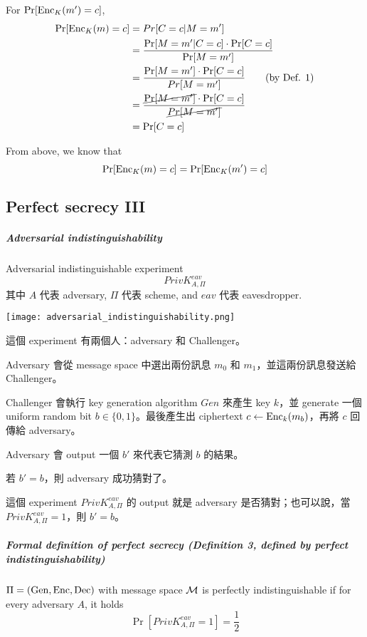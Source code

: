For \(\Pr[\operatorname{Enc}_K(m') = c]\),
\begin{align*}
	\Pr[\operatorname{Enc}_K(m) = c] &= Pr[C = c | M = m']\\
	&= \frac{\Pr[M = m' | C = c] \cdot \Pr[C = c]}{\Pr[M = m']} \\
	&= \frac{\Pr[M = m'] \cdot \Pr[C =c]}{Pr[M = m']} \tag{by Def. 1} \\
	&= \frac{\cancel{\Pr[M = m']} \cdot \Pr[C = c]}{\cancel{Pr[M = m']}} \\
	&= \Pr[C = c]
\end{align*}

From above, we know that
\[
	\Pr[\operatorname{Enc}_K(m) = c] = \Pr[\operatorname{Enc}_K(m') = c]
\]


\subsection{Perfect secrecy III}

\subparagraph{Adversarial indistinguishability}

Adversarial indistinguishable experiment
\[PrivK_{A, \Pi}^{eav}\]
其中 \(A\) 代表 adversary, \(\Pi\) 代表 scheme, and \(eav\) 代表 eavesdropper.

\texttt{[image: adversarial\_indistinguishability.png]}

這個 experiment 有兩個人：adversary 和 Challenger。
\begin{steps}
	\item Adversary 會從 message space 中選出兩份訊息 \(m_0\) 和 \(m_1\)，並這兩份訊息發送給 Challenger。
	\item Challenger 會執行 key generation algorithm \(Gen\) 來產生 key \(k\)，並 generate 一個 uniform random bit \(b \in \{0,1\}\)。最後產生出 ciphertext \(c \leftarrow \operatorname{Enc}_k(m_b)\)，再將 \(c\) 回傳給 adversary。
	\item Adversary 會 output 一個 \(b'\) 來代表它猜測 \(b\) 的結果。
	\item 若 \(b' = b\)，則 adversary 成功猜對了。
\end{steps}

這個 experiment \(PrivK_{A, \Pi}^{eav}\) 的 output 就是 adversary 是否猜對；也可以說，當 \(PrivK_{A, \Pi}^{eav} = 1\)，則 \(b' = b\)。


\subparagraph{Formal definition of perfect secrecy (\textbf{Definition 3, defined by perfect indistinguishability})}

\(\Pi = (\operatorname{Gen}, \operatorname{Enc}, \operatorname{Dec})\) with message space \(\operatorname{\mathcal{M}}\) is perfectly indistinguishable if for every adversary \(A\), it holds
\[\Pr[PrivK_{A, \Pi}^{eav} = 1] = \frac{1}{2}\]

